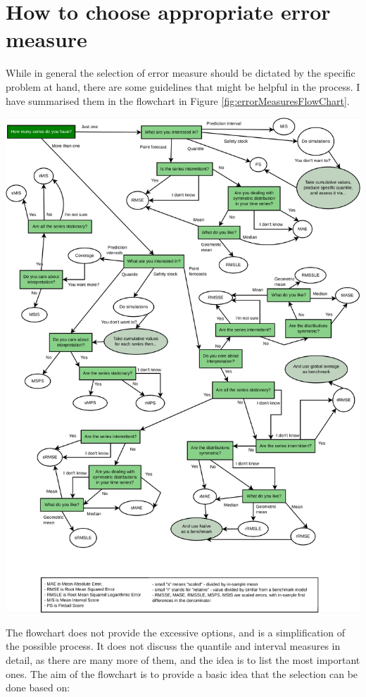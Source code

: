 \documentclass[
]{book}
\theoremstyle{definition}
\theoremstyle{definition}
\theoremstyle{definition}
\theoremstyle{definition}
\theoremstyle{remark}
\begin{document}
\hypertarget{errorMeasuresSelection}{%
\section{How to choose appropriate error measure}\label{errorMeasuresSelection}}

While in general the selection of error measure should be dictated by the specific problem at hand, there are some guidelines that might be helpful in the process. I have summarised them in the flowchart in Figure \ref{fig:errorMeasuresFlowChart}.

\includegraphics{./images/errorMeasuresFlowChart.pdf}

The flowchart does not provide the excessive options, and is a simplification of the possible process. It does not discuss the quantile and interval measures in detail, as there are many more of them, and the idea is to list the most important ones. The aim of the flowchart is to provide a basic idea that the selection can be done based on:
\end{document}
